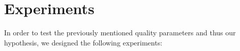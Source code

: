 











\section{Experiments}
In order to test the previously mentioned quality parameters and thus our hypothesis, we designed the following experiments:

